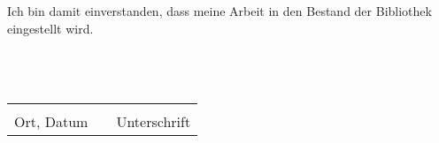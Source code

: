 Ich bin damit einverstanden, dass meine Arbeit in den Bestand der Bibliothek eingestellt wird.
\\
\\
\\
\\
\begin{tabular}{lp{2em}l}
 \hspace{3cm}   && \hspace{3cm} \\\cline{1-1}\cline{3-3}
 Ort, Datum     && Unterschrift
\end{tabular}